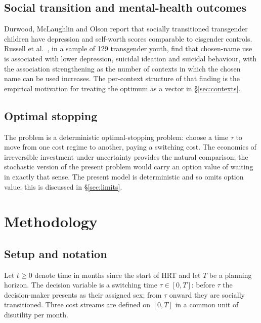 \documentclass[11pt,a4paper]{article}
\theoremstyle{remark}
\begin{document}
\subsection{Social transition and mental-health outcomes}

Durwood, McLaughlin and Olson \cite{durwood2017} report that socially transitioned transgender children have depression and self-worth scores comparable to cisgender controls. Russell et al.\ \cite{russell2018}, in a sample of 129 transgender youth, find that chosen-name use is associated with lower depression, suicidal ideation and suicidal behaviour, with the association strengthening as the number of contexts in which the chosen name can be used increases. The per-context structure of that finding is the empirical motivation for treating the optimum as a vector in \S\ref{sec:contexts}.

\subsection{Optimal stopping}

The problem is a deterministic optimal-stopping problem: choose a time $\tau$ to move from one cost regime to another, paying a switching cost. The economics of irreversible investment under uncertainty \cite{dixit1994} provides the natural comparison; the stochastic version of the present problem would carry an option value of waiting in exactly that sense. The present model is deterministic and so omits option value; this is discussed in \S\ref{sec:limits}.

\section{Methodology}
\label{sec:method}

\subsection{Setup and notation}

Let $t\ge 0$ denote time in months since the start of HRT and let $T$ be a planning horizon. The decision variable is a switching time $\tau\in[0,T]$: before $\tau$ the decision-maker presents as their assigned sex; from $\tau$ onward they are socially transitioned. Three cost streams are defined on $[0,T]$ in a common unit of disutility per month.
\end{document}
